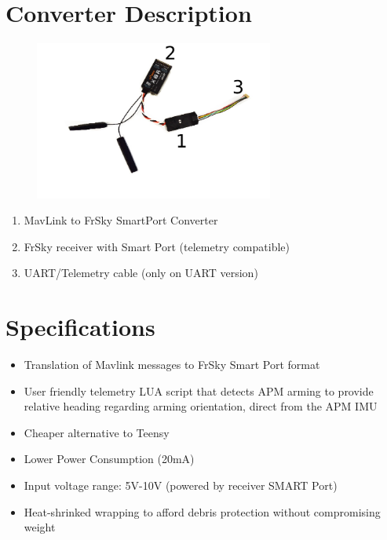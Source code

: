 \documentclass[english]{article}
\begin{document}
\section{Converter Description}

\begin{figure}[h!]
        \centering
        \includegraphics[width=0.7\textwidth]{Assembled Converter}
\end{figure}

\begin{enumerate}

\item MavLink to FrSky SmartPort Converter
\item FrSky receiver with Smart Port (telemetry compatible)
\item UART/Telemetry cable (only on UART version)

\end{enumerate}

\section{Specifications}

\begin{itemize}

\item Translation of Mavlink messages to FrSky Smart Port format
\item User friendly telemetry LUA script that detects APM arming to provide relative heading regarding arming orientation, direct from the APM IMU
\item Cheaper alternative to Teensy
\item Lower Power Consumption (20mA)
\item Input voltage range: 5V-10V (powered by receiver SMART Port)
\item Heat-shrinked wrapping to afford debris protection without compromising weight

\end{itemize}
\end{document}
